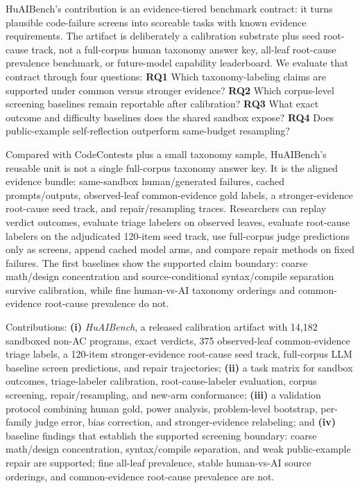 \documentclass[conference]{IEEEtran}
\begin{document}
HuAIBench's contribution is an evidence-tiered benchmark contract: it turns
plausible code-failure screens into scoreable tasks with known evidence
requirements. The artifact is deliberately a calibration substrate plus seed
root-cause track, not a full-corpus human taxonomy answer key, all-leaf root-cause
prevalence benchmark, or future-model capability leaderboard. We evaluate that
contract through four questions:
\textbf{RQ1} Which taxonomy-labeling claims are supported under common versus
stronger evidence? \textbf{RQ2} Which corpus-level screening baselines remain
reportable after calibration? \textbf{RQ3} What exact outcome and difficulty
baselines does the shared sandbox expose? \textbf{RQ4} Does public-example self-reflection
outperform same-budget resampling?

Compared with CodeContests plus a small taxonomy sample, HuAIBench's reusable unit is
not a single full-corpus taxonomy answer key. It is the aligned evidence bundle:
same-sandbox human/generated failures, cached prompts/outputs, observed-leaf
common-evidence gold labels, a stronger-evidence root-cause seed track, and
repair/resampling traces. Researchers can replay verdict outcomes, evaluate triage
labelers on observed leaves, evaluate root-cause labelers on the adjudicated 120-item
seed track, use full-corpus judge predictions only as screens, append cached model
arms, and compare repair methods on fixed failures. The first baselines show the
supported claim boundary: coarse math/design concentration and source-conditional
syntax/compile separation survive calibration, while fine human-vs-AI taxonomy
orderings and common-evidence root-cause prevalence do not.

Contributions: \textbf{(i)} \emph{HuAIBench}, a released calibration artifact with
14{,}182 sandboxed non-AC programs, exact verdicts, 375 observed-leaf
common-evidence triage labels, a 120-item stronger-evidence root-cause seed track,
full-corpus LLM baseline screen predictions, and repair trajectories; \textbf{(ii)}
a task matrix for sandbox
outcomes, triage-labeler calibration, root-cause-labeler evaluation, corpus
screening, repair/resampling, and new-arm conformance; \textbf{(iii)} a validation
protocol combining human gold, power analysis, problem-level bootstrap, per-family
judge error, bias correction, and stronger-evidence relabeling; and \textbf{(iv)}
baseline findings that establish the supported screening boundary: coarse math/design
concentration, syntax/compile separation, and weak public-example repair are
supported; fine all-leaf prevalence, stable human-vs-AI source orderings, and
common-evidence root-cause prevalence are not.
\end{document}
